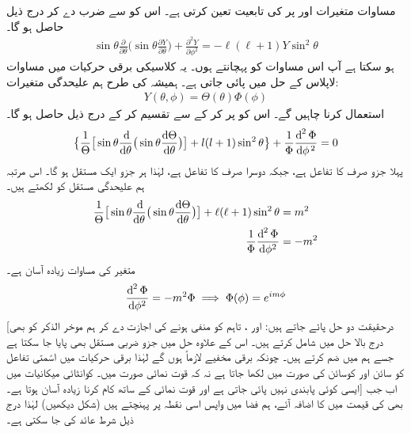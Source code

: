 مساوات  متغیرات  اور  پر  کی تابعیت تعین کرتی ہے۔
اس کو  سے ضرب دے کر درج ذیل حاصل ہو گا۔
\begin{align}\label{مساوات_ابعادی_زاویائی_مساوات}
\sin{\theta}\frac{\partial}{\partial{\theta}}\big(\sin{\theta}\frac{\partial{Y}}{\partial{\theta}}\big)+\frac{\partial^{2}{Y}}{\partial{\phi^{2}}}=-\ell(\ell+1)Y\sin^{2}{\theta} 
\end{align}
ہو سکتا ہے آپ اس مساوات کو پہچانتے ہوں۔ یہ کلاسیکی برقی حرکیات میں مساوات لاپلاس کے حل میں پائی جاتی ہے۔ ہمیشہ کی طرح ہم علیحدگی متغیرات:
\begin{align}
Y(\theta,\phi)=\Theta(\theta)\Phi(\phi) 
\end{align}
استعمال کرنا چاہیں گے۔ اس کو پر کر کے  سے تقسیم کر کے درج ذیل حاصل ہو گا۔ 
\begin{align*}
\big\{\frac{1}{\Theta}\big[\sin{\theta}\frac{\dif}{\dif\theta}\big(\sin\theta\frac{\dif{\Theta}}{\dif{\theta}}\big)\big]+l(l+1)\sin^{2}{\theta}\big\}+\frac{1}{\Phi}\frac{\dif^{\,2}{\Phi}}{\dif{\phi^{\,2}}}=0 
\end{align*}
پہلا جزو صرف  کا تفاعل ہے، جبکہ دوسرا صرف  کا تفاعل ہے، لہٰذا ہر جزو ایک مستقل ہو گا۔ اس مرتبہ ہم علیحدگی مستقل کو  لکھتے ہیں۔
\begin{align}
\frac{1}{\Theta}\big[\sin{\theta}\frac{\dif}{\dif\theta}\big(\sin\theta\frac{\dif{\Theta}}{\dif{\theta}}\big)\big]+\ell(\ell+1)\sin^{2}{\theta}&=m^{2} \\
\frac{1}{\Phi}\frac{\dif^{\,2}{\Phi}}{\dif{\phi^{2}}}&=-m^{2}\label{مساوات_تین_ابعادی_ایم}
\end{align}
 متغیر  کی مساوات زیادہ آسان ہے۔
 \begin{align}
\frac{\dif^{\,2}{\Phi}}{\dif{\phi^{2}}}=-m^{2}\Phi\implies \Phi(\phi)=e^{im\phi} 
\end{align}
[درحقیقت دو حل پائے جاتے ہیں:  اور ، تاہم  کو منفی ہونے کی اجازت دے کر ہم موخر الذکر کو بھی درج بالا حل میں شامل کرتے ہیں۔ اس کے علاوہ حل میں جزو ضربی مستقل بھی پایا جا سکتا ہے جسے ہم  میں ضم کرتے ہیں۔ چونکہ برقی مخفیے لازماً  ہوں گے لہٰذا برقی حرکیات میں اسّمتی تفاعل  کو سائن اور کوسائن کی صورت میں لکھا جاتا ہے نہ کہ قوت نمائی صورت میں۔ کوانٹائی میکانیات میں ایسی کوئی پابندی نہیں پائی جاتی ہے اور قوت نمائی کے ساتھ کام کرنا زیادہ آسان ہوتا ہے۔] اب جب بھی  کی قیمت میں  کا اضافہ آئے، ہم فضا میں واپس اسی نقطہ پر پہنچتے ہیں (شکل  دیکھیں) لہٰذا درج ذیل شرط عائد کی جا سکتی ہے۔

